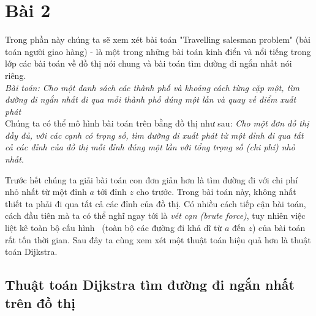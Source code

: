 \section{Bài 2}
Trong phần này chúng ta sẽ xem xét bài toán "Travelling salesman problem" (bài toán 
người giao hàng) - là một trong những bài toán kinh điển và nổi tiếng trong lớp các
bài toán về đồ thị nói chung và bài toán tìm đường đi ngắn nhất nói riêng. \\

\textit{Bài toán: Cho một danh sách các thành phố và khoảng cách từng cặp một, 
tìm đường đi ngắn nhất đi qua mỗi thành phố đúng một lần và quay về điểm xuất phát} \\


Chúng ta có thể mô hình bài toán trên bằng đồ thị như sau: \textit{Cho một đơn đồ thị đầy đủ, 
với các cạnh có trọng số, tìm đường đi xuất phát từ một đỉnh đi qua tất cả các đỉnh 
của đồ thị mỗi đỉnh đúng một lần với tổng trọng số (chi phí) nhỏ nhất.}

Trước hết chúng ta giải bài toán con đơn giản hơn là tìm đường đi với chi phí nhỏ nhất từ
một đỉnh $a$ tới đỉnh $z$ cho trước. Trong bài toán này, không nhất thiết ta phải đi qua 
tất cả các đỉnh của đồ thị. Có nhiều cách tiếp cận bài toán, cách đầu tiên mà ta có thể nghĩ 
ngay tới là \textit{vét cạn (brute force)}, tuy nhiên việc liệt kê toàn bộ cấu hình \
(toàn bộ các đường đi khả dĩ từ $a$ đến $z$) của bài toán rất tốn thời gian. Sau đây ta cùng
xem xét một thuật toán hiệu quả hơn là thuật toán Dijkstra.

\subsection{Thuật toán Dijkstra tìm đường đi ngắn nhất trên đồ thị}


